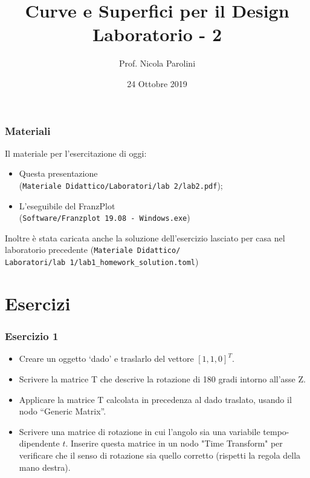 \documentclass{beamer}
\title[Curve e Sup. - Lab 2]{Curve e Superfici per il Design \\ Laboratorio - 2}
\author[Prof. Parolini]{Prof. Nicola Parolini}
\date{24 Ottobre 2019}
\newcommand{\frnzplt}{FranzPlot }
\begin{document}
\begin{frame}
\maketitle
\end{frame}

\begin{frame}
\frametitle{Materiali}
Il materiale per l'esercitazione di oggi:
\begin{itemize}
\item Questa presentazione \\ (\texttt{Materiale Didattico/Laboratori/lab 2/lab2.pdf});
\item L'eseguibile del \frnzplt \\ (\texttt{Software/Franzplot 19.08 - Windows.exe})
\end{itemize}
Inoltre \`e stata caricata anche la soluzione dell'esercizio lasciato per casa nel laboratorio precedente
    (\texttt{Materiale Didattico/ \\ Laboratori/lab 1/lab1\_homework\_solution.toml})
\end{frame}



\section{Esercizi}
%
\begin{frame}
\frametitle{Esercizio 1}
\begin{itemize}
    \item Creare un oggetto `dado' e traslarlo del vettore $[1, 1, 0]^T$.
    \item Scrivere la matrice T che descrive la rotazione di 180 gradi intorno all'asse Z.
    \item Applicare la matrice T calcolata in precedenza al dado traslato, usando il nodo
        ``Generic Matrix''.
    \item Scrivere una matrice di rotazione in cui l'angolo sia una variabile tempo-dipendente $t$. Inserire questa matrice in un nodo "Time Transform"
        per verificare che il senso di rotazione sia quello corretto (rispetti la regola della mano destra).
\end{itemize}
\end{frame}
\end{document}
